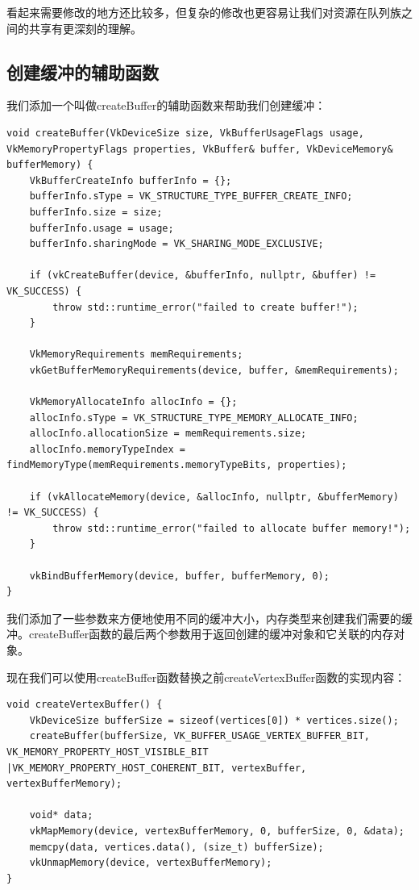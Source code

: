 \documentclass{ctexart}
\begin{document}
看起来需要修改的地方还比较多，但复杂的修改也更容易让我们对资源在队列族之间的共享有更深刻的理解。

\subsection{创建缓冲的辅助函数}

我们添加一个叫做createBuffer的辅助函数来帮助我们创建缓冲：

\begin{lstlisting}[language={[ANSI]C}]
void createBuffer(VkDeviceSize size, VkBufferUsageFlags usage, VkMemoryPropertyFlags properties, VkBuffer& buffer, VkDeviceMemory& bufferMemory) {
	VkBufferCreateInfo bufferInfo = {};
	bufferInfo.sType = VK_STRUCTURE_TYPE_BUFFER_CREATE_INFO;
	bufferInfo.size = size;
	bufferInfo.usage = usage;
	bufferInfo.sharingMode = VK_SHARING_MODE_EXCLUSIVE;

	if (vkCreateBuffer(device, &bufferInfo, nullptr, &buffer) != VK_SUCCESS) {
		throw std::runtime_error("failed to create buffer!");
	}

	VkMemoryRequirements memRequirements;
	vkGetBufferMemoryRequirements(device, buffer, &memRequirements);

	VkMemoryAllocateInfo allocInfo = {};
	allocInfo.sType = VK_STRUCTURE_TYPE_MEMORY_ALLOCATE_INFO;
	allocInfo.allocationSize = memRequirements.size;
	allocInfo.memoryTypeIndex = findMemoryType(memRequirements.memoryTypeBits, properties);

	if (vkAllocateMemory(device, &allocInfo, nullptr, &bufferMemory) != VK_SUCCESS) {
		throw std::runtime_error("failed to allocate buffer memory!");
	}

	vkBindBufferMemory(device, buffer, bufferMemory, 0);
}
\end{lstlisting}

我们添加了一些参数来方便地使用不同的缓冲大小，内存类型来创建我们需要的缓冲。createBuffer函数的最后两个参数用于返回创建的缓冲对象和它关联的内存对象。

现在我们可以使用createBuffer函数替换之前createVertexBuffer函数的实现内容：

\begin{lstlisting}[language={[ANSI]C}]
void createVertexBuffer() {
	VkDeviceSize bufferSize = sizeof(vertices[0]) * vertices.size();
	createBuffer(bufferSize, VK_BUFFER_USAGE_VERTEX_BUFFER_BIT, VK_MEMORY_PROPERTY_HOST_VISIBLE_BIT |VK_MEMORY_PROPERTY_HOST_COHERENT_BIT, vertexBuffer, vertexBufferMemory);

	void* data;
	vkMapMemory(device, vertexBufferMemory, 0, bufferSize, 0, &data);
	memcpy(data, vertices.data(), (size_t) bufferSize);
	vkUnmapMemory(device, vertexBufferMemory);
}
\end{lstlisting}
\end{document}
